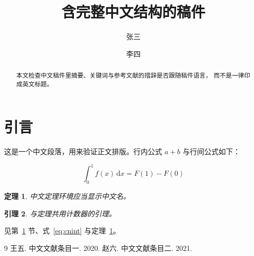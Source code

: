 \documentclass[UTF8]{ctexart}
\newtheorem{theorem}{定理}
\newtheorem{lemma}[theorem]{引理}
\begin{document}
\title{含完整中文结构的稿件}
\author{张三 \and 李四}
\date{}

\begin{abstract}
本文检查中文稿件里摘要、关键词与参考文献的措辞是否跟随稿件语言，
而不是一律印成英文标题。
\end{abstract}


\section{引言}
\label{sec:cntro}

这是一个中文段落，用来验证正文排版。行内公式 $a+b$ 与行间公式如下：

\begin{equation}
\int_{0}^{1} f(x)\,\mathrm{d}x = F(1) - F(0)
\label{eq:cnint}
\end{equation}

\begin{theorem}
\label{thm:cn}
中文定理环境应当显示中文名。
\end{theorem}

\begin{lemma}
\label{lem:cn}
与定理共用计数器的引理。
\end{lemma}

见第~\ref{sec:cntro} 节、式~\eqref{eq:cnint} 与定理~\ref{thm:cn}。

\begin{thebibliography}{9}
 王五. 中文文献条目一. 2020.
 赵六. 中文文献条目二. 2021.
\end{thebibliography}
\end{document}

